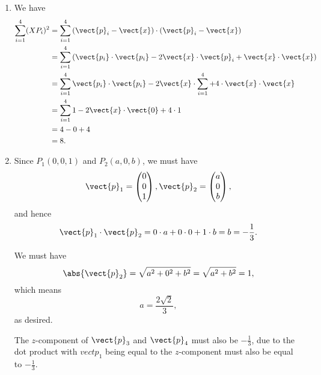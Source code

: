 \begin{enumerate}
    \item We have
          \begin{align*}
              \sum_{i = 1}^{4} (X P_i)^2 & = \sum_{i = 1}^{4} \left(\vect{p}_i - \vect{x}\right) \cdot \left(\vect{p}_i - \vect{x}\right)                       \\
                                         & = \sum_{i = 1}^{4} \left(\vect{p_i} \cdot \vect{p_i} - 2 \vect{x} \cdot \vect{p}_i + \vect{x} \cdot \vect{x}\right)  \\
                                         & = \sum_{i = 1}^{4} \vect{p_i} \cdot \vect{p_i} - 2 \vect{x} \cdot \sum_{i = 1}^{4} + 4 \cdot \vect{x} \cdot \vect{x} \\
                                         & = \sum_{i = 1}^{4} 1 - 2 \vect{x} \cdot \vect{0} + 4 \cdot 1                                                         \\
                                         & = 4 - 0 + 4                                                                                                          \\
                                         & = 8.
          \end{align*}

    \item Since \(P_1 (0, 0, 1)\) and \(P_2 (a, 0, b)\), we must have
          \[
              \vect{p}_1 = \begin{pmatrix}
                  0 \\ 0 \\ 1
              \end{pmatrix},
              \vect{p}_2 = \begin{pmatrix}
                  a \\ 0 \\ b
              \end{pmatrix},
          \]
          and hence
          \[
              \vect{p}_1 \cdot \vect{p}_2 = 0 \cdot a + 0 \cdot 0 + 1 \cdot b = b = - \frac{1}{3}.
          \]

          We must have
          \[
              \abs{\vect{p}_2} = \sqrt{a^2 + 0^2 + b^2} = \sqrt{a^2 + b^2} = 1,
          \]
          which means
          \[
              a = \frac{2\sqrt{2}}{3},
          \]
          as desired.

          The \(z\)-component of \(\vect{p}_3\) and \(\vect{p}_4\) must also be \(-\frac{1}{3}\), due to the dot product with \(vect{p}_1\) being equal to the \(z\)-component must also be equal to \(-\frac{1}{3}\).


\end{enumerate}
